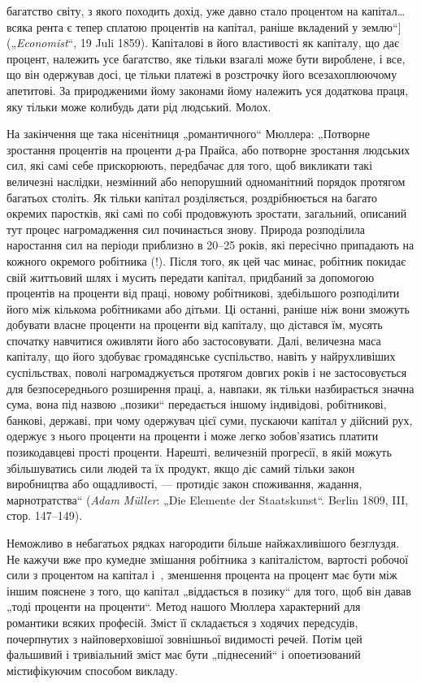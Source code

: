 \parcont{}  %
багатство світу, з якого походить дохід, уже давно стало процентом
на капітал\dots{} всяка рента є тепер сплатою процентів на
капітал, раніше вкладений у землю“] („\emph{Economist}“, 19 Juli 1859).
Капіталові в його властивості як капіталу, що дає процент, належить
усе багатство, яке тільки взагалі може бути вироблене,
і все, що він одержував досі, це тільки платежі в розстрочку його
всезахоплюючому апетитові. За природженими йому законами
йому належить уся додаткова праця, яку тільки може колибудь
дати рід людський. Молох.

На закінчення ще така нісенітниця „романтичного“ Мюллера:
„Потворне зростання процентів на проценти д-ра Прайса, або
потворне зростання людських сил, які самі себе прискорюють,
передбачає для того, щоб викликати такі величезні наслідки,
незмінний або непорушний одноманітний порядок протягом багатьох
століть. Як тільки капітал розділяється, роздрібнюється
на багато окремих паростків, які самі по собі продовжують
зростати, загальний, описаний тут процес нагромадження сил
починається знову. Природа розподілила наростання сил на
періоди приблизно в 20--25 років, які пересічно припадають
на кожного окремого робітника (!). Після того, як цей час
минає, робітник покидає свій життьовий шлях і мусить передати
капітал, придбаний за допомогою процентів на проценти від
праці, новому робітникові, здебільшого розподілити його між
кількома робітниками або дітьми. Ці останні, раніше ніж вони
зможуть добувати власне проценти на проценти від капіталу,
що дістався їм, мусять спочатку навчитися оживляти його або
застосовувати. Далі, величезна маса капіталу, що його здобуває
громадянське суспільство, навіть у найрухливіших суспільствах,
поволі нагромаджується протягом довгих років і не
застосовується для безпосереднього розширення праці, а, навпаки,
як тільки назбирається значна сума, вона під назвою „позики“
передається іншому індивідові, робітникові, банкові, державі,
при чому одержувач цієї суми, пускаючи капітал у дійсний рух,
одержує з нього проценти на проценти і може легко зобов’язатись
платити позикодавцеві прості проценти. Нарешті, величезній
прогресії, в якій можуть збільшуватись сили людей та їх
продукт, якщо діє самий тільки закон виробництва або ощадливості,
— протидіє закон споживання, жадання, марнотратства“
(\emph{Adam Müller}: „Die Elemente der Staatskunst“. Berlin 1809, III,
стор. 147--149).

Неможливо в небагатьох рядках нагородити більше найжахливішого
безглуздя. Не кажучи вже про кумедне змішання
робітника з капіталістом, вартості робочої сили з процентом
на капітал і~, зменшення процента на процент має бути
між іншим пояснене з того, що капітал „віддається в позику“ для
того, щоб він давав „тоді проценти на проценти“. Метод нашого
Мюллера характерний для романтики всяких професій. Зміст її
складається з ходячих передсудів, почерпнутих з найповерховішої
зовнішньої видимості речей. Потім цей фальшивий і тривіальний
зміст має бути „піднесений“ і опоетизований містифікуючим
способом викладу.

